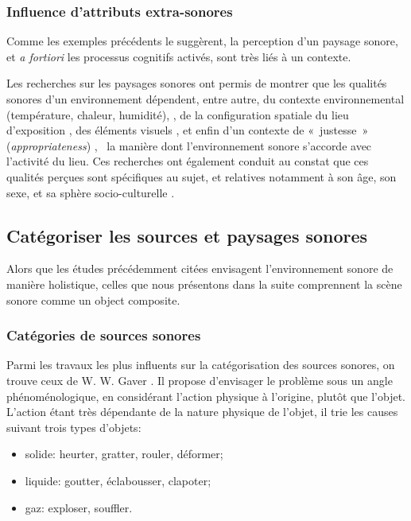 \subsubsection{Influence d'attributs extra-sonores}
\label{sec:ch3_contexteDimension}

Comme les exemples précédents le suggèrent, la perception d'un paysage sonore, et \emph{a fortiori} les processus cognitifs activés, sont très liés à un contexte.

Les recherches sur les paysages sonores ont permis de montrer que les qualités sonores d'un environnement dépendent, entre autre, du contexte environnemental (température, chaleur, humidité), \citep{meng2013field,jeon2011non}, de la configuration spatiale du lieu d'exposition \citep{hall2013exploratory}, des éléments visuels \citep{de2006quiet,guillen2007importance}, et enfin d'un contexte de «~justesse~» (\emph{appropriateness}) \citep{nielbo2013investigating,de2006quiet}, \ie~la manière dont l'environnement sonore s'accorde avec l'activité du lieu. Ces recherches ont également conduit au constat que ces qualités perçues sont spécifiques au sujet, et relatives notamment à son âge, son sexe, et sa sphère socio-culturelle \citep{hall2013exploratory,yu2010factors,guillen2007importance}.
 
\subsection{Catégoriser les sources et paysages sonores}
\label{sec:ch3_catSourceSoundScape}

Alors que les études précédemment citées envisagent l'environnement sonore de manière holistique, celles que nous présentons dans la suite comprennent la scène sonore comme un object composite.

\subsubsection{Catégories de sources sonores}
\label{sec:ch3_catSource}

Parmi les travaux les plus influents sur la catégorisation des sources sonores, on trouve ceux de W. W. Gaver \citep{gaver1993world,gaver1993we}. Il propose d'envisager le problème sous un angle phénoménologique, en considérant l'action physique à l'origine, plutôt que l'objet. L'action étant très dépendante de la nature physique de l'objet, il trie les causes suivant trois types d'objets:

\begin{itemize}
\item solide: heurter, gratter, rouler, déformer;
\item liquide: goutter, éclabousser, clapoter;
\item gaz: exploser, souffler.
\end{itemize} 

